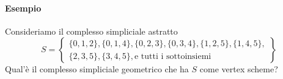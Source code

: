 \documentclass[a4paper]{report}
\begin{document}
\paragraph{Esempio}
Consideriamo il complesso simpliciale astratto
\[
    S=\left\{
    \begin{array}{l}
        \{0,1,2\},\{0,1,4\},\{0,2,3\},\{0,3,4\},\{1,2,5\},\{1,4,5\}, \\
        \{2,3,5\},\{3,4,5\},\text{e tutti i sottoinsiemi}
    \end{array}
    \right\}
\]
Qual'è il complesso simpliciale geometrico che ha $S$ come vertex scheme?
\begin{center}



    \begin{tikzpicture}[x=0.75pt,y=0.75pt,yscale=-1,xscale=1]


\end{tikzpicture}
\end{center}
\end{document}
